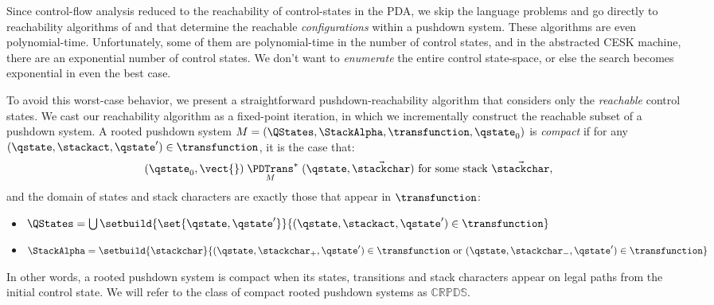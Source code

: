 Since control-flow analysis reduced to the reachability of
control-states in the PDA, we skip the language problems and go
directly to reachability algorithms of
\citet{mattmight:Bouajjani:1997:PDA-Reachability,dvanhorn:Kodumal2004Set,mattmight:Reps:1998:CFL}
and \citet{mattmight:Reps:2005:Weighted-PDA} that determine the
reachable \emph{configurations} within a pushdown system.
These algorithms are even polynomial-time.
Unfortunately, some of them are polynomial-time in the number of
control states, and in the abstracted CESK machine, there are an
exponential number of control states.
We don't want to \emph{enumerate} the entire control state-space, or
else the search becomes exponential in even the best case.

 


To avoid this worst-case behavior, we present a straightforward
pushdown-reachability algorithm that considers only the
\emph{reachable} control states.
We cast our reachability algorithm as a fixed-point iteration, in
which we incrementally construct the reachable subset of a pushdown system.
A rooted pushdown system $M = (\QStates, \StackAlpha, \transfunction, \qstate_0)$ is \emph{compact}
if for any $(\qstate,\stackact,\qstate') \in \transfunction$, it is the case that:
\begin{equation*}
  (\qstate_0,\vect{}) \mathrel{\underset{M}{\PDTrans}^*} (\qstate,\vec{\stackchar})
  \text{ for some stack } \vec{\stackchar}
  \text,
\end{equation*}
and the domain of states and stack characters are exactly those that appear in $\transfunction$:
\begin{itemize}
\item[]{$\QStates = \bigcup\setbuild{\set{\qstate,\qstate'}}{(\qstate,\stackact,\qstate') \in \transfunction}$}
\item[]{$\StackAlpha = \setbuild{\stackchar}{(\qstate,\stackchar_+,\qstate') \in \transfunction \text{ or } (\qstate,\stackchar_-,\qstate') \in \transfunction}$}
\end{itemize}
In other words, a rooted pushdown system is compact when its states, transitions and stack characters appear on legal paths from the initial control state.
We will refer to the class of compact rooted pushdown systems as $\mathbb{CRPDS}$.

